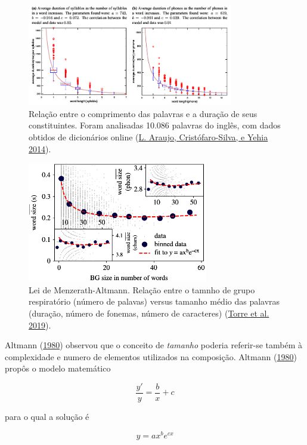 \documentclass[
  ignorenonframetext,
  aspectratio=169]{beamer}
\begin{document}
\begin{frame}
\begin{figure}
\centering
\includegraphics[width=0.8\textwidth,height=\textheight]{leolca-menzerath.png}
\caption{Relação entre o comprimento das palavras e a duração de seus
constituintes. Foram analisadas 10.086 palavras do inglês, com dados
obtidos de dicionários online
(\protect\hyperlink{ref-araujo2014menzerath}{L. Araujo,
Cristófaro-Silva, e Yehia 2014}).}
\end{figure}
\end{frame}

\begin{frame}
\begin{figure}
\centering
\includegraphics[width=0.7\textwidth,height=\textheight]{menzerath_bg.png}
\caption{Lei de Menzerath-Altmann. Relação entre o tamnho de grupo
respiratório (número de palavas) versus tamanho médio das palavras
(duração, número de fonemas, número de caracteres)
(\protect\hyperlink{ref-Torre2019}{Torre et al. 2019}).}
\end{figure}
\end{frame}

\begin{frame}
Altmann (\protect\hyperlink{ref-altmann1980}{1980}) observou que o
conceito de \textit{tamanho} poderia referir-se também à complexidade e
numero de elementos utilizados na composição. Altmann
(\protect\hyperlink{ref-altmann1980}{1980}) propôs o modelo matemático

\[
\frac{y'}{y} = \frac{b}{x} + c 
\]

para o qual a solução é

\[
y = a x^b e^{cx}
\]
\end{frame}
\end{document}
